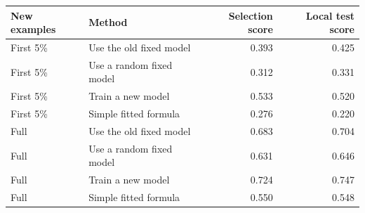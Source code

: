 \begin{tabular}{llrr}
\toprule New examples & Method & Selection score & Local test score \\
\midrule
First 5\% & Use the old fixed model & 0.393 & 0.425 \\
First 5\% & Use a random fixed model & 0.312 & 0.331 \\
First 5\% & Train a new model & 0.533 & 0.520 \\
First 5\% & Simple fitted formula & 0.276 & 0.220 \\
Full & Use the old fixed model & 0.683 & 0.704 \\
Full & Use a random fixed model & 0.631 & 0.646 \\
Full & Train a new model & 0.724 & 0.747 \\
Full & Simple fitted formula & 0.550 & 0.548 \\
\bottomrule\end{tabular}
